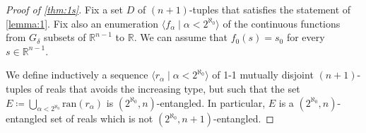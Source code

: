 \documentclass[12pt]{amsart}
\theoremstyle{definition}
\theoremstyle{remark}
\begin{document}
\begin{proof}[Proof of \cref{thm:1s}]
Fix a set $D$ of $(n+1)$-tuples that satisfies the statement of \cref{lemma:1}. Fix also an enumeration $\langle f_\alpha \mid \alpha < 2^{\aleph_0}\rangle$ of the continuous functions from $G_\delta$ subsets of $\mathbb{R}^{n-1}$ to $\mathbb{R}$. We can assume that $f_0(s) = s_0$ for every $s \in  \mathbb{R}^{n-1}$.

We define inductively a sequence $\langle r_\alpha \mid \alpha < 2^{\aleph_0} \rangle$ of 1-1 mutually disjoint $(n+1)$-tuples of reals that avoids the increasing type, but such that the set $ E \coloneqq \bigcup_{\alpha < 2^{\aleph_0}} \mathrm{ran}(r_\alpha)$ is $(2^{\aleph_0}, n)$-entangled. In particular, $E$ is a $(2^{\aleph_0}, n)$-entangled set of reals which is not $(2^{\aleph_0}, n+1)$-entangled.


\end{proof}
\end{document}
